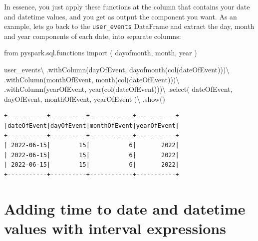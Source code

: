 \documentclass[
  11pt,
  letterpaper,
  DIV=11,
  numbers=noendperiod]{scrreprt}
\newenvironment{Shaded}{\begin{snugshade}}{\end{snugshade}}
\newcommand{\ImportTok}[1]{\textcolor[rgb]{0.00,0.46,0.62}{#1}}
\newcommand{\NormalTok}[1]{\textcolor[rgb]{0.00,0.23,0.31}{#1}}
\newcommand{\OperatorTok}[1]{\textcolor[rgb]{0.37,0.37,0.37}{#1}}
\newcommand{\StringTok}[1]{\textcolor[rgb]{0.13,0.47,0.30}{#1}}
\begin{document}
In essence, you just apply these functions at the column that contains
your date and datetime values, and you get as output the component you
want. As an example, lets go back to the \texttt{user\_events} DataFrame
and extract the day, month and year components of each date, into
separate columns:

\begin{Shaded}
\begin{Highlighting}[]
\ImportTok{from}\NormalTok{ pyspark.sql.functions }\ImportTok{import}\NormalTok{ (}
\NormalTok{    dayofmonth,}
\NormalTok{    month,}
\NormalTok{    year}
\NormalTok{)}

\NormalTok{user\_events}\OperatorTok{\textbackslash{}}
\NormalTok{    .withColumn(}\StringTok{\textquotesingle{}dayOfEvent\textquotesingle{}}\NormalTok{, dayofmonth(col(}\StringTok{\textquotesingle{}dateOfEvent\textquotesingle{}}\NormalTok{)))}\OperatorTok{\textbackslash{}}
\NormalTok{    .withColumn(}\StringTok{\textquotesingle{}monthOfEvent\textquotesingle{}}\NormalTok{, month(col(}\StringTok{\textquotesingle{}dateOfEvent\textquotesingle{}}\NormalTok{)))}\OperatorTok{\textbackslash{}}
\NormalTok{    .withColumn(}\StringTok{\textquotesingle{}yearOfEvent\textquotesingle{}}\NormalTok{, year(col(}\StringTok{\textquotesingle{}dateOfEvent\textquotesingle{}}\NormalTok{)))}\OperatorTok{\textbackslash{}}
\NormalTok{    .select(}
        \StringTok{\textquotesingle{}dateOfEvent\textquotesingle{}}\NormalTok{, }\StringTok{\textquotesingle{}dayOfEvent\textquotesingle{}}\NormalTok{,}
        \StringTok{\textquotesingle{}monthOfEvent\textquotesingle{}}\NormalTok{, }\StringTok{\textquotesingle{}yearOfEvent\textquotesingle{}}
\NormalTok{    )}\OperatorTok{\textbackslash{}}
\NormalTok{    .show()}
\end{Highlighting}
\end{Shaded}

\begin{verbatim}
+-----------+----------+------------+-----------+
|dateOfEvent|dayOfEvent|monthOfEvent|yearOfEvent|
+-----------+----------+------------+-----------+
| 2022-06-15|        15|           6|       2022|
| 2022-06-15|        15|           6|       2022|
| 2022-06-15|        15|           6|       2022|
+-----------+----------+------------+-----------+
\end{verbatim}

\hypertarget{sec-interval-express}{%
\section{Adding time to date and datetime values with interval
expressions}\label{sec-interval-express}}
\end{document}
